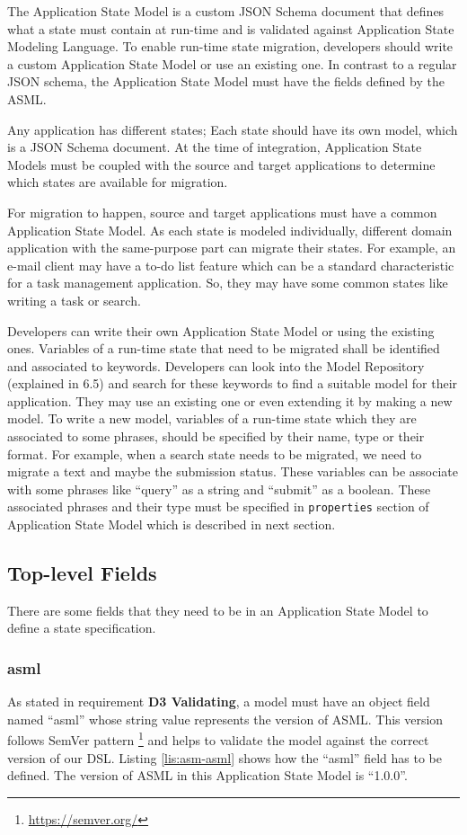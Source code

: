 
The Application State Model is a custom JSON Schema document that defines what a state must contain at run-time and is validated against Application State Modeling Language. To enable run-time state migration, developers should write a custom Application State Model or use an existing one. In contrast to a regular JSON schema, the Application State Model must have the fields defined by the ASML.

Any application has different states; Each state should have its own model, which is a JSON Schema document. At the time of integration, Application State Models must be coupled with the source and target applications to determine which states are available for migration.

For migration to happen, source and target applications must have a common Application State Model. As each state is modeled individually, different domain application with the same-purpose part can migrate their states. For example, an e-mail client may have a to-do list feature which can be a standard characteristic for a task management application. So, they may have some common states like writing a task or search.

Developers can write their own Application State Model or using the existing ones. Variables of a run-time state that need to be migrated shall be identified and associated to keywords. Developers can look into the Model Repository (explained in 6.5) and search for these keywords to find a suitable model for their application. They may use an existing one or even extending it by making a new model. To write a new model, variables of a run-time state which they are associated to some phrases, should be specified by their name, type or their format. For example, when a search state needs to be migrated, we need to migrate a text and maybe the submission status. These variables can be associate with some phrases like “query” as a string and “submit” as a boolean. These associated phrases and their type must be specified in \lstinline[basicstyle=\ttfamily]{properties} section of Application State Model which is described in next section. 

\subsection{Top-level Fields}
There are some fields that they need to be in an Application State Model to define a state specification.

\subsubsection{asml}
As stated in requirement \textbf{D3 Validating}, a model must have an object field named “asml” whose string value represents the version of ASML. This version follows SemVer pattern \footnote{\url{https://semver.org/}} and helps to validate the model against the correct version of our DSL. Listing \ref{lis:asm-asml} shows how the “asml” field has to be defined. The version of ASML in this Application State Model is “1.0.0”.

